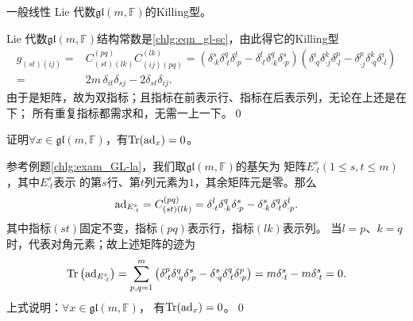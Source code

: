 \begin{example}
    一般线性 Lie 代数$\mathfrak{gl}(m,\mathbb{F})$的Killing型。
\end{example}
 Lie 代数$\mathfrak{gl}(m,\mathbb{F})$结构常数是\eqref{chlg:eqn_gl-sc}，由此得它的Killing型
\begin{equation}\label{chlg:eqn_KillingF-gl}
\begin{aligned}
    g_{(st)(ij)} =& C^{(pq)}_{(st)(lk)} C^{(lk)}_{(ij)(pq)}
    = \left(\delta^s_{\cdot k} \delta^q_{\cdot t} \delta^l_{\cdot p}
    -\delta^l_{\cdot t} \delta^q_{\cdot k} \delta^s_{\cdot p} \right)
    \left(\delta^i_{\cdot q} \delta^k_{\cdot j} \delta^p_{\cdot l}
    -\delta^p_{\cdot j} \delta^k_{\cdot q} \delta^i_{\cdot l} \right) \\
    =& 2m\, \delta_{it} \delta_{sj} - 2\delta_{st} \delta_{ij}.
\end{aligned}
\end{equation}
由于是矩阵，故为双指标；且指标在前表示行、指标在后表示列，无论在上还是在下；
所有重复指标都需求和，无需一上一下。\qed


\begin{example}\label{chlg:exm_Tr-gl}
    证明$\forall x\in \mathfrak{gl}(m,\mathbb{F})$，有${\rm Tr}({\rm ad}_{x})=0$。
\end{example}
参考例题\ref{chlg:exam_GL-la}，我们取$\mathfrak{gl}(m,\mathbb{F})$的基矢为
矩阵$E^s_{\cdot t}(1\leqslant s,t \leqslant m)$，其中$E^s_{\cdot t}$表示
的第$s$行、第$t$列元素为$1$，其余矩阵元是零。那么
\begin{align*}
    {\rm ad}_{E^s_{\cdot t}}=C^{(pq)}_{(st)(lk)} 
    = \delta^l_{\cdot t} \delta^q_{\cdot k} \delta^s_{\cdot p}
    -\delta^s_{\cdot k} \delta^q_{\cdot t} \delta^l_{\cdot p}.
\end{align*}
其中指标$(st)$固定不变，指标$(pq)$表示行，指标$(lk)$表示列。
当$l=p$、$k=q$时，代表对角元素；故上述矩阵的迹为
\begin{align*}
    {\rm Tr}\left( {\rm ad}_{E^s_{\cdot t}} \right)=
    \sum_{p,q=1}^{m}\left(\delta^p_{\cdot t} \delta^q_{\cdot q} \delta^s_{\cdot p}
    -\delta^s_{\cdot q} \delta^q_{\cdot t} \delta^p_{\cdot p} \right)
    = m \delta^s_{\cdot t}- m \delta^s_{\cdot t}=0.
\end{align*}    
上式说明：$\forall x\in \mathfrak{gl}(m,\mathbb{F})$，
有${\rm Tr}({\rm ad}_{x})=0$。\qed




